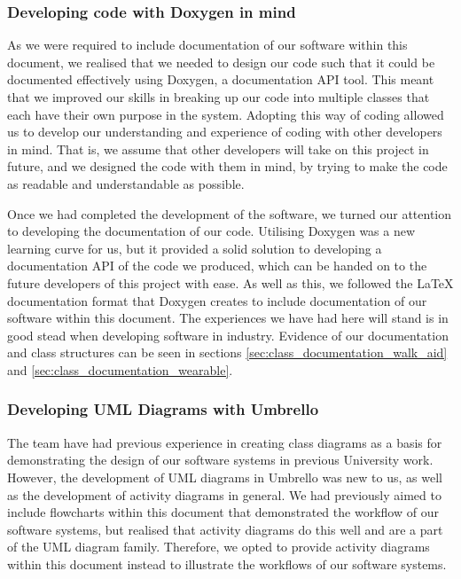             \subsubsection{Developing code with Doxygen in mind}

                As we were required to include documentation of our software within this document, we realised that we needed to design our code such that it could be documented effectively using Doxygen, a documentation API tool. This meant that we improved our skills in breaking up our code into multiple classes that each have their own purpose in the system. Adopting this way of coding allowed us to develop our understanding and experience of coding with other developers in mind. That is, we assume that other developers will take on this project in future, and we designed the code with them in mind, by trying to make the code as readable and understandable as possible.

                Once we had completed the development of the software, we turned our attention to developing the documentation of our code. Utilising Doxygen was a new learning curve for us, but it provided a solid solution to developing a documentation API of the code we produced, which can be handed on to the future developers of this project with ease. As well as this, we followed the LaTeX documentation format that Doxygen creates to include documentation of our software within this document. The experiences we have had here will stand is in good stead when developing software in industry. Evidence of our documentation and class structures can be seen in sections \ref{sec:class_documentation_walk_aid} and \ref{sec:class_documentation_wearable}.

            \subsubsection{Developing UML Diagrams with Umbrello}

                The team have had previous experience in creating class diagrams as a basis for demonstrating the design of our software systems in previous University work. However, the development of UML diagrams in Umbrello was new to us, as well as the development of activity diagrams in general. We had previously aimed to include flowcharts within this document that demonstrated the workflow of our software systems, but realised that activity diagrams do this well and are a part of the UML diagram family. Therefore, we opted to provide activity diagrams within this document instead to illustrate the workflows of our software systems.

